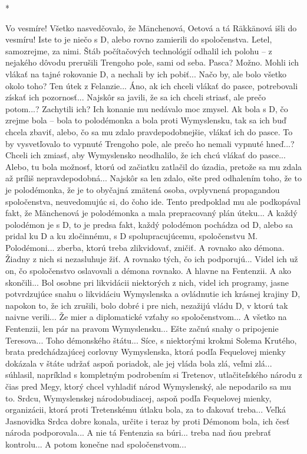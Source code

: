 \documentclass{book}
\begin{document}
\begin{center}

*

\end{center}

Vo vesmíre! Všetko nasvedčovalo, že Mänchenová, Oetová a tá Räkkänová išli do vesmíru! Iste to je niečo s D, alebo rovno zamierili do spoločenstva. Letel, samozrejme, za nimi. Štáb počítačových technológií odhalil ich polohu – z nejakého dôvodu prerušili Trengoho pole, sami od seba. Pasca? Možno. Mohli ich vlákať na tajné rokovanie D, a nechali by ich pobiť... Načo by, ale bolo všetko okolo toho? Ten útek z Felanzie... Áno, ak ich chceli vlákať do pasce, potrebovali získať ich pozornosť... Najskôr sa javili, že sa ich chceli striasť, ale prečo potom...? Zachytili ich? Ich konanie mu nedávalo moc zmysel. Ak bola s D, čo zrejme bola – bola to polodémonka a bola proti Wymyslensku, tak sa ich buď chcela zbaviť, alebo, čo sa mu zdalo pravdepodobnejšie, vlákať ich do pasce. To by vysvetľovalo to vypnuté Trengoho pole, ale prečo ho nemali vypnuté hneď...? Chceli ich zmiasť, aby Wymyslensko neodhalilo, že ich chcú vlákať do pasce... Alebo, tu bola možnosť, ktorú od začiatku zatlačil do úzadia, pretože sa mu zdala až príliš nepravdepodobná... Najskôr sa len zdalo, ešte pred odhalením toho, že to je polodémonka, že je to obyčajná zmätená osoba, ovplyvnená propagandou spoločenstva, neuvedomujúc si, do čoho ide. Tento predpoklad mu ale podkopával fakt, že Mänchenová je polodémonka a mala prepracovaný plán úteku... A každý polodémon je s D, to je predsa fakt, každý polodémon pochádza od D, alebo sa pridal ku D a ku zločinnému, s D spolupracujúcemu, spoločenstvu M. Polodémoni... zberba, ktorú treba zlikvidovať, zničiť. A rovnako ako démona. Žiadny z nich si nezasluhuje žiť. A rovnako tých, čo ich podporujú... Videl ich už on, čo spoločenstvo oslavovali a démona rovnako. A hlavne na Fentenzii. A ako skončili... Bol osobne pri likvidácii niektorých z nich, videl ich programy, jasne potvrdzujúce snahu o likvidáciu Wymyslenska a ovládnutie ich krásnej krajiny D, napokon to, že ich zrušili, bolo dobré i pre nich, nezažijú vládu D, v ktorú tak naivne verili... Že mier a diplomatické vzťahy so spoločenstvom... A všetko na Fentenzii, len pár na pravom Wymyslensku... Ešte začnú snahy o pripojenie Teresova... Toho démonského štátu... Síce, s niektorými krokmi Solema Krutého, brata predchádzajúcej corlovny Wymyslenska, ktorá podľa Fequelovej mienky dokázala v štáte udržať aspoň poriadok, ale jej vláda bola zlá, veľmi zlá... súhlasil, napríklad s kompletným podrobením si Tretenov, utlačiteľského národu z čias pred Megy, ktorý chcel vyhladiť národ Wymyslenský, ale nepodarilo sa mu to. Srdcu, Wymyslenskej národobudiacej, aspoň podľa Fequelovej mienky, organizácii, ktorá proti Tretenskému útlaku bola, za to ďakovať treba... Veľká Jasnovidka Srdca dobre konala, určite i teraz by proti Démonom bola, ich česť národa podporovala... A nie tá Fentenzia sa búri... treba nad ňou prebrať kontrolu... A potom konečne nad spoločenstvom...
\end{document}
